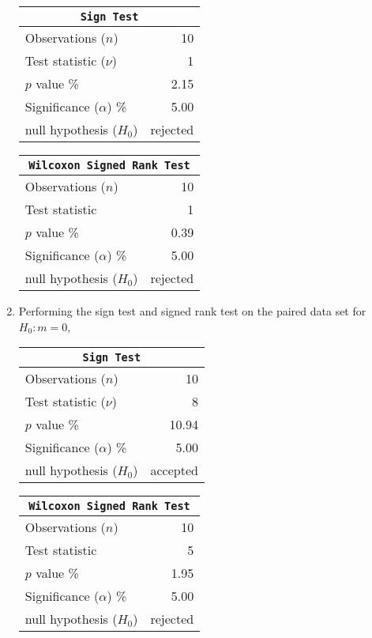 \begin{enumerate}
	\begin{table}[H]
		\centering
		\begin{tabular}{@{}lr@{}}
			\toprule
			\multicolumn{2}{c}{\texttt{Sign Test}} \\
			\midrule
			Observations ($n$)         &        10 \\
			Test statistic ($\nu$)     &         1 \\
			$p$ value \%               &      2.15 \\
			Significance ($\alpha$) \% &      5.00 \\
			null hypothesis ($H_0$)    &  rejected \\
			\bottomrule
		\end{tabular}
		\qquad
		\begin{tabular}{@{}lr@{}}
			\toprule
			\multicolumn{2}{c}{\texttt{Wilcoxon Signed Rank Test}} \\
			\midrule
			Observations ($n$)         &        10 \\
			Test statistic             &         1 \\
			$p$ value \%               &      0.39 \\
			Significance ($\alpha$) \% &      5.00 \\
			null hypothesis ($H_0$)    &  rejected \\
			\bottomrule
		\end{tabular}
	\end{table}
	\bigskip
	
	\item Performing the sign test and signed rank test on the paired data set for $ H_0 : m = 0 $,
	
	\begin{table}[H]
		\centering
		\begin{tabular}{@{}lr@{}}
			\toprule
			\multicolumn{2}{c}{\texttt{Sign Test}} \\
			\midrule
			Observations ($n$)         &        10 \\
			Test statistic ($\nu$)     &         8 \\
			$p$ value \%               &     10.94 \\
			Significance ($\alpha$) \% &      5.00 \\
			null hypothesis ($H_0$)    &  accepted \\
			\bottomrule
		\end{tabular}
		\qquad
		\begin{tabular}{@{}lr@{}}
			\toprule
			\multicolumn{2}{c}{\texttt{Wilcoxon Signed Rank Test}} \\
			\midrule
			Observations ($n$)         &        10 \\
			Test statistic             &         5 \\
			$p$ value \%               &      1.95 \\
			Significance ($\alpha$) \% &      5.00 \\
			null hypothesis ($H_0$)    &  rejected \\
			\bottomrule
		\end{tabular}
	\end{table}
	\bigskip
	

\end{enumerate}
